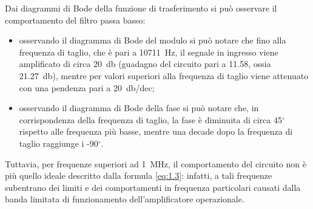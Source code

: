 Dai diagrammi di Bode della funzione di trasferimento si può osservare il comportamento del filtro passa basso:
\begin{itemize}
	\item osservando il diagramma di Bode del modulo si può notare che fino alla frequenza di taglio, che è pari a \SI{10711}{\hertz}, il segnale in ingresso viene amplificato di circa \SI{20}{\decibel} (guadagno del circuito pari a 11.58, ossia \SI{21.27}{\decibel}), mentre per valori superiori alla frequenza di taglio viene attenuato con una pendenza pari a \SI{20}{\decibel}/dec;
	\item osservando il diagramma di Bode della fase si può notare che, in corrispondenza della frequenza di taglio, la fase è diminuita di circa 45$^{\circ}$rispetto alle frequenza più basse, mentre una decade dopo la frequenza di taglio raggiunge i -90$^{\circ}$.
\end{itemize}

Tuttavia, per frequenze superiori ad \SI{1}{\mega\hertz}, il comportamento del circuito non è più quello ideale descritto dalla formula \ref{eq:1.3}: infatti, a tali frequenze subentrano dei limiti e dei comportamenti in frequenza particolari causati dalla banda limitata di funzionamento dell'amplificatore operazionale.


